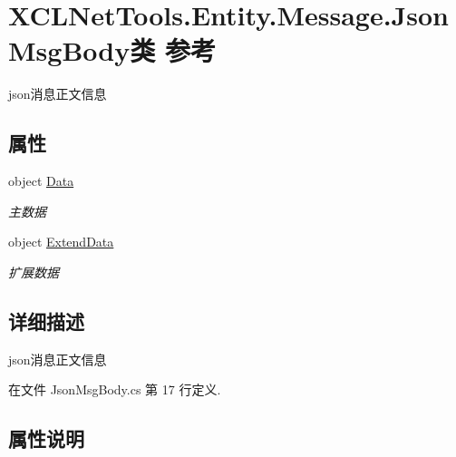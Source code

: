 \hypertarget{class_x_c_l_net_tools_1_1_entity_1_1_message_1_1_json_msg_body}{}\section{X\+C\+L\+Net\+Tools.\+Entity.\+Message.\+Json\+Msg\+Body类 参考}
\label{class_x_c_l_net_tools_1_1_entity_1_1_message_1_1_json_msg_body}


json消息正文信息  


\subsection*{属性}
\begin{DoxyCompactItemize}
\item 
object \hyperlink{class_x_c_l_net_tools_1_1_entity_1_1_message_1_1_json_msg_body_a8bf6d68ba33b65eac5431b4d2873e719}{Data}
\begin{DoxyCompactList}\small\item\em 主数据 \end{DoxyCompactList}\item 
object \hyperlink{class_x_c_l_net_tools_1_1_entity_1_1_message_1_1_json_msg_body_a0382629d68979ea8a39383a1d9891ab7}{Extend\+Data}
\begin{DoxyCompactList}\small\item\em 扩展数据 \end{DoxyCompactList}\end{DoxyCompactItemize}


\subsection{详细描述}
json消息正文信息 



在文件 Json\+Msg\+Body.\+cs 第 17 行定义.



\subsection{属性说明}
\mbox{\label{class_x_c_l_net_tools_1_1_entity_1_1_message_1_1_json_msg_body_a8bf6d68ba33b65eac5431b4d2873e719}} 
